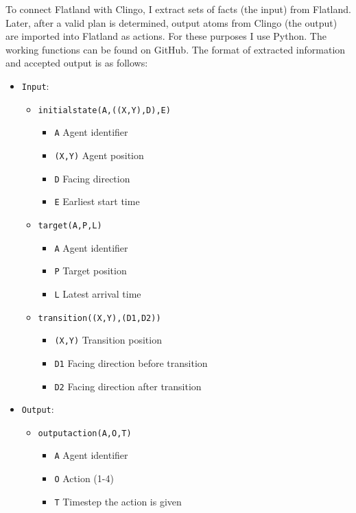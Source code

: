 \documentclass{llncs}
\begin{document}
\begin{multicols*}{2}
To connect Flatland with Clingo, I extract sets of facts (the input) from Flatland. Later, after a valid plan is determined, output atoms from Clingo (the output) are imported into Flatland as actions. For these purposes I use Python. The working functions can be found on GitHub. The format of extracted information and accepted output is as follows:

\begin{itemize}[nosep]
    \item \texttt{Input}:
    \begin{itemize}[nosep]
        \item \texttt{initialstate(A,((X,Y),D),E)}
        \begin{itemize}[nosep]
            \item \texttt{A} Agent identifier
            \item \texttt{(X,Y)} Agent position
            \item \texttt{D} Facing direction
            \item \texttt{E} Earliest start time
        \end{itemize}
        \item \texttt{target(A,P,L)}
        \begin{itemize}[nosep]
            \item \texttt{A} Agent identifier
            \item \texttt{P} Target position
            \item \texttt{L} Latest arrival time
        \end{itemize}
        \item \texttt{transition((X,Y),(D1,D2))}
        \begin{itemize}[nosep]
            \item \texttt{(X,Y)} Transition position
            \item \texttt{D1} Facing direction before transition
            \item \texttt{D2} Facing direction after transition
        \end{itemize}
    \end{itemize}
    \item \texttt{Output}:
    \begin{itemize}[nosep]
        \item \texttt{outputaction(A,O,T)}
        \begin{itemize}[nosep]
            \item \texttt{A} Agent identifier
            \item \texttt{O} Action (1-4)
            \item \texttt{T} Timestep the action is given
        \end{itemize}
    \end{itemize}
\end{itemize}
\vspace{2mm}


\end{multicols*}
\end{document}
